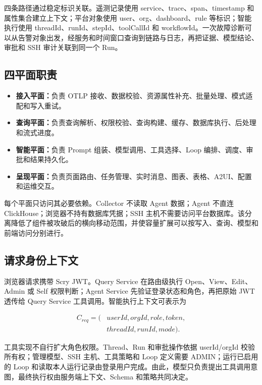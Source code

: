 \documentclass[conference,10pt]{IEEEtran}
\begin{document}
四条路径通过稳定标识关联。遥测记录使用 service、trace、span、timestamp 和属性集合建立上下文；平台对象使用 user、org、dashboard、rule 等标识；智能执行使用 threadId、runId、stepId、toolCallId 和 workflowId。一次故障诊断可以从告警对象出发，经服务和时间窗口查询到链路与日志，再把证据、模型结论、审批和 SSH 审计关联到同一个 Run。

\subsection{四平面职责}

\begin{itemize}
  \item \textbf{接入平面：}负责 OTLP 接收、数据校验、资源属性补充、批量处理、模式适配和写入重试。
  \item \textbf{查询平面：}负责查询解析、权限校验、查询构建、缓存、数据库执行、后处理和流式进度。
  \item \textbf{智能平面：}负责 Prompt 组装、模型调用、工具选择、Loop 编排、调度、审批和结果持久化。
  \item \textbf{呈现平面：}负责页面路由、任务管理、实时消息、图表、表格、A2UI、配置和运维交互。
\end{itemize}

每个平面只访问其必要依赖。Collector 不读取 Agent 数据；Agent 不直连 ClickHouse；浏览器不持有数据库凭据；SSH 主机不需要访问平台数据库。该分离降低了组件被攻破后的横向移动范围，并使容量扩展可以按写入、查询、模型和前端访问分别进行。

\subsection{请求身份上下文}

浏览器请求携带 Scry JWT。Query Service 在路由级执行 Open、View、Edit、Admin 或 Self 权限判断；Agent Service 先验证登录状态和角色，再把原始 JWT 透传给 Query Service 工具调用。智能执行上下文可表示为

\begin{equation}
\begin{aligned}
  C_{req}=(&userId,orgId,role,token,\\
           &threadId,runId,mode).
\end{aligned}
\end{equation}

工具实现不自行扩大角色权限。Thread、Run 和审批操作依据 userId/orgId 校验所有权；管理模型、SSH 主机、工具策略和 Loop 定义需要 ADMIN；运行已启用的 Loop 和读取本人运行记录由登录用户完成。由此，模型只负责提出工具调用意图，最终执行权由服务端上下文、Schema 和策略共同决定。
\end{document}
